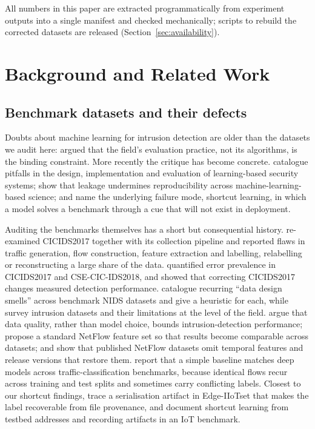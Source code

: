 \documentclass[preprint,12pt]{elsarticle}
\begin{document}
All numbers in this paper are extracted programmatically from experiment
outputs into a single manifest and checked mechanically; scripts to rebuild the
corrected datasets are released (Section~\ref{sec:availability}).

\section{Background and Related Work}
\label{sec:related}

\subsection{Benchmark datasets and their defects}

Doubts about machine learning for intrusion detection are older than the
datasets we audit here: \citet{sommer2010_closedworld} argued that the field's
evaluation practice, not its algorithms, is the binding constraint. More
recently the critique has become concrete. \citet{arp2022_dosdonts} catalogue
pitfalls in the design, implementation and evaluation of learning-based security
systems; \citet{kapoor2023_leakage} show that leakage undermines reproducibility
across machine-learning-based science; and \citet{geirhos2020_shortcut} name the
underlying failure mode, shortcut learning, in which a model solves a benchmark
through a cue that will not exist in deployment.

Auditing the benchmarks themselves has a short but consequential history.
\citet{engelen2021_troubleshooting} re-examined CICIDS2017 together with its
collection pipeline and reported flaws in traffic generation, flow construction,
feature extraction and labelling, relabelling or reconstructing a large share of
the data. \citet{liu2022_errorprevalence} quantified error prevalence in
CICIDS2017 and CSE-CIC-IDS2018, and \citet{lanvin2022_errors_cicids} showed that
correcting CICIDS2017 changes measured detection performance.
\citet{flood2024_badsmells} catalogue recurring ``data design smells'' across
benchmark NIDS datasets and give a heuristic for each, while
\citet{goldschmidt2025_survey} survey intrusion datasets and their limitations
at the level of the field. \citet{chen2021_dataquality} argue that data quality,
rather than model choice, bounds intrusion-detection performance;
\citet{sarhan2022_standardfeature} propose a standard NetFlow feature set so
that results become comparable across datasets; and \citet{luay2025_temporal}
show that published NetFlow datasets omit temporal features and release versions
that restore them. \citet{jerabek2025_simplemodel} report that a simple baseline
matches deep models across traffic-classification benchmarks, because identical
flows recur across training and test splits and sometimes carry conflicting
labels. Closest to our shortcut findings, \citet{galal2026_edgeiiotset} trace a
serialisation artifact in Edge-IIoTset that makes the label recoverable from
file provenance, and \citet{roy2026_shortcut} document shortcut learning from
testbed addresses and recording artifacts in an IoT benchmark.
\end{document}
